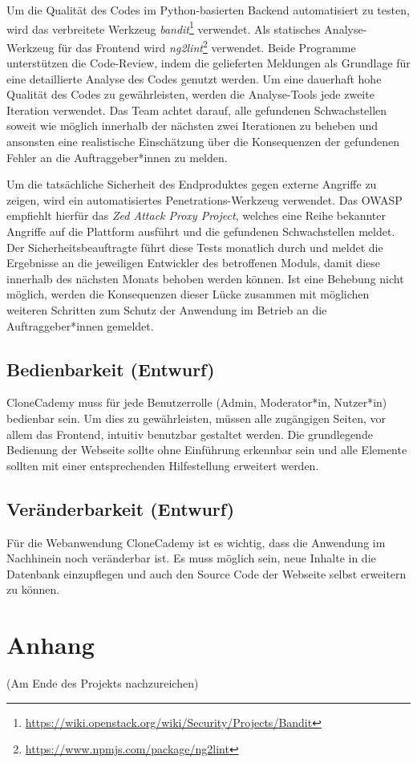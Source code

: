 \documentclass[accentcolor=tud0b,12pt,paper=a4]{tudreport}
\begin{document}
Um die Qualität des Codes im Python-basierten Backend automatisiert zu testen, wird das verbreitete Werkzeug \emph{bandit}\footnote{\href{https://wiki.openstack.org/wiki/Security/Projects/Bandit}{https://wiki.openstack.org/wiki/Security/Projects/Bandit}} verwendet. Als statisches Analyse-Werkzeug für das Frontend wird \emph{ng2lint}\footnote{\href{https://www.npmjs.com/package/ng2lint}{https://www.npmjs.com/package/ng2lint}} verwendet. Beide Programme unterstützen die Code-Review, indem die gelieferten Meldungen als Grundlage für eine detaillierte Analyse des Codes genutzt werden. Um eine dauerhaft hohe Qualität des Codes zu gewährleisten, werden die Analyse-Tools jede zweite Iteration verwendet. Das Team achtet darauf, alle gefundenen Schwachstellen soweit wie möglich innerhalb der nächsten zwei Iterationen zu beheben und ansonsten eine realistische Einschätzung über die Konsequenzen der gefundenen Fehler an die Auftraggeber*innen zu melden.

Um die tatsächliche Sicherheit des Endproduktes gegen externe Angriffe zu zeigen, wird ein automatisiertes Penetrations-Werkzeug verwendet. Das OWASP empfiehlt hierfür das \emph{Zed Attack Proxy Project}, welches eine Reihe bekannter Angriffe auf die Plattform ausführt und die gefundenen Schwachstellen meldet. Der Sicherheitsbeauftragte führt diese Tests monatlich durch und meldet die Ergebnisse an die jeweiligen Entwickler des betroffenen Moduls, damit diese innerhalb des nächsten Monats behoben werden können. Ist eine Behebung nicht möglich, werden die Konsequenzen dieser Lücke zusammen mit möglichen weiteren Schritten zum Schutz der Anwendung im Betrieb an die Auftraggeber*innen gemeldet.

\section{Bedienbarkeit (Entwurf)}
CloneCademy muss für jede Benutzerrolle (Admin, Moderator*in, Nutzer*in) bedienbar sein. Um dies zu gewährleisten, müssen alle zugängigen Seiten, vor allem das Frontend, intuitiv benutzbar gestaltet werden. Die grundlegende Bedienung der Webseite sollte ohne Einführung erkennbar sein und alle Elemente sollten mit einer entsprechenden Hilfestellung erweitert werden.

\section{Veränderbarkeit (Entwurf)}
Für die Webanwendung CloneCademy ist es wichtig, dass die Anwendung im Nachhinein noch veränderbar ist. Es muss möglich sein, neue Inhalte in die Datenbank einzupflegen und auch den Source Code der Webseite selbst erweitern zu können.




\appendix
	\chapter{Anhang}
		(Am Ende des Projekts nachzureichen)\\
\end{document}
